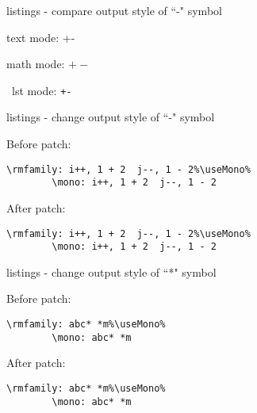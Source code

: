 \documentclass{article}
\begin{document}
\begin{example}{listings - compare output style of ``-" symbol}
  \newfontfamily{}
  \mono
  
  text mode: +-    \par
  math mode: $+-$  \par
  \ lst mode: \lstinline|+-|
\end{example}

\begin{example}{listings - change output style of ``-" symbol}
  \newfontfamily{}
  
  \makeatletter
  \def\useMono{\lst@AddToHook{OnNewLine}{\mono}}
  \def\useRoman{\gdef\lsthk@OnNewLine{\rmfamily}} %
  \makeatother
  
  Before patch:
  \begin{lstlisting}[escapechar=\%]
    \rmfamily: i++, 1 + 2  j--, 1 - 2%\useMono%
        \mono: i++, 1 + 2  j--, 1 - 2
  \end{lstlisting}

  \makeatletter
  \lst@CCPutMacro
      \@empty\z@\@empty
  \makeatother
  
  \useRoman
  After patch:
  \begin{lstlisting}[escapechar=\%]
    \rmfamily: i++, 1 + 2  j--, 1 - 2%\useMono%
        \mono: i++, 1 + 2  j--, 1 - 2
  \end{lstlisting}
\end{example}

\begin{example}{listings - change output style of ``*" symbol}
  \newfontfamily{}
  
  \makeatletter
  \def\useMono{\lst@AddToHook{OnNewLine}{\mono}}
  \def\useRoman{\gdef\lsthk@OnNewLine{\rmfamily}} %
  \makeatother
  \useRoman
  
  Before patch:
  \begin{lstlisting}[escapechar=\%]
    \rmfamily: abc* *m%\useMono%
        \mono: abc* *m
  \end{lstlisting}

  \makeatletter
  \lst@CCPutMacro
      \@empty\z@\@empty
  \makeatother
  
  \useRoman
  After patch:
  \begin{lstlisting}[escapechar=\%]
    \rmfamily: abc* *m%\useMono%
        \mono: abc* *m
  \end{lstlisting}
\end{example}
\end{document}
